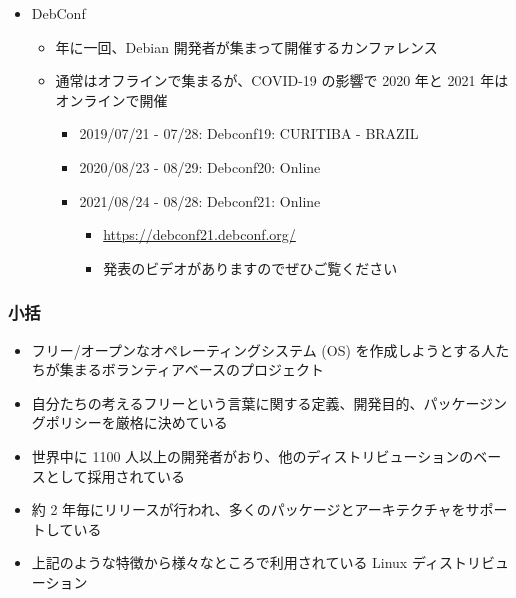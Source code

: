 \documentclass[mingoth,a4paper]{jsarticle}
\begin{document}
\begin{itemize}
  \item DebConf

    \begin{itemize}
    \item 年に一回、Debian 開発者が集まって開催するカンファレンス
    \item 通常はオフラインで集まるが、COVID-19 の影響で 2020 年と 2021 年はオンラインで開催
      \begin{itemize}
      \item 2019/07/21 - 07/28: Debconf19: CURITIBA - BRAZIL
      \item 2020/08/23 - 08/29: Debconf20: Online
      \item 2021/08/24 - 08/28: Debconf21: Online
        \begin{itemize}
        \item \url{https://debconf21.debconf.org/}
        \item 発表のビデオがありますのでぜひご覧ください
        \end{itemize}
      \end{itemize}
    \end{itemize}
    

\end{itemize}

\subsubsection{小括}

\begin{itemize}
\item フリー/オープンなオペレーティングシステム (OS) を作成しようとする人たちが集まるボランティアベースのプロジェクト
\item 自分たちの考えるフリーという言葉に関する定義、開発目的、パッケージングポリシーを厳格に決めている
\item 世界中に 1100 人以上の開発者がおり、他のディストリビューションのベースとして採用されている
\item 約 2 年毎にリリースが行われ、多くのパッケージとアーキテクチャをサポートしている
\item 上記のような特徴から様々なところで利用されている Linux ディストリビューション
\end{itemize}
\end{document}

